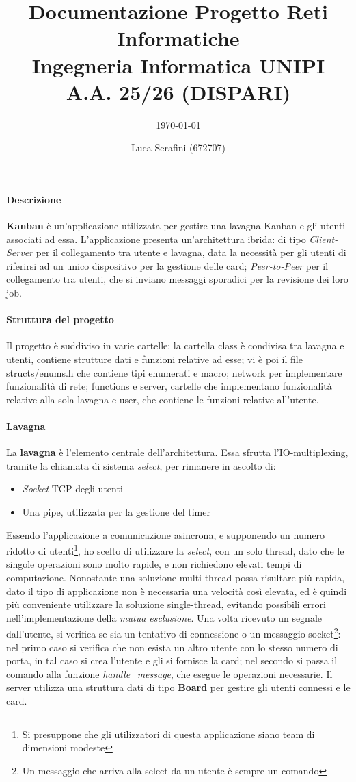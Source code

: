 \documentclass[11pt,a4paper,twocolumn,twoside]{paper}
\author{Luca Serafini (672707)}
\title{\vspace{-6em}Documentazione Progetto Reti Informatiche\\Ingegneria Informatica UNIPI A.A. 25/26 (DISPARI)}
\subtitle{\today}
\begin{document}
\maketitle
\paragraph{Descrizione}
    \textbf{Kanban} è un'applicazione utilizzata per gestire una lavagna Kanban e gli utenti associati ad essa. L'applicazione presenta un'architettura ibrida: di tipo \textit{Client-Server} per il collegamento tra utente e lavagna, data la necessità per gli utenti di riferirsi ad un unico dispositivo per la gestione delle card; \textit{Peer-to-Peer} per il collegamento tra utenti, che si inviano messaggi sporadici per la revisione dei loro job. 
\paragraph{Struttura del progetto}
    Il progetto è suddiviso in varie cartelle: la cartella class è condivisa tra lavagna e utenti, contiene strutture dati e funzioni relative ad esse; vi è poi il file structs/enums.h che contiene tipi enumerati e macro; network per implementare funzionalità di rete; functions e server, cartelle che implementano funzionalità relative alla sola lavagna e user, che contiene le funzioni relative all'utente.  
\paragraph{Lavagna}
    La \textbf{lavagna} è l'elemento centrale dell'architettura. Essa sfrutta l'IO-multiplexing, tramite la chiamata di sistema \textit{select}, per rimanere in ascolto di:
    \begin{itemize}
        \item \textit{Socket} TCP degli utenti
        \item Una pipe, utilizzata per la gestione del timer
    \end{itemize}
    Essendo l'applicazione a comunicazione asincrona, e supponendo un numero ridotto di utenti\footnote{Si presuppone che gli utilizzatori di questa applicazione siano team di dimensioni modeste}, ho scelto di utilizzare la \textit{select}, con un solo thread, dato che le singole operazioni sono molto rapide, e non richiedono elevati tempi di computazione. Nonostante una soluzione multi-thread possa risultare più rapida, dato il tipo di applicazione non è necessaria una velocità così elevata, ed è quindi più conveniente utilizzare la soluzione single-thread, evitando possibili errori nell'implementazione della \textit{mutua esclusione}. Una volta ricevuto un segnale dall'utente, si verifica se sia un tentativo di connessione o un messaggio socket\footnote{Un messaggio che arriva alla select da un utente è sempre un comando}: nel primo caso si verifica che non esista un altro utente con lo stesso numero di porta, in tal caso si crea l'utente e gli si fornisce la card; nel secondo si passa il comando alla funzione \textit{handle\_message}, che esegue le operazioni necessarie. Il server utilizza una struttura dati di tipo \textbf{Board} per gestire gli utenti connessi e le card.
\end{document}
